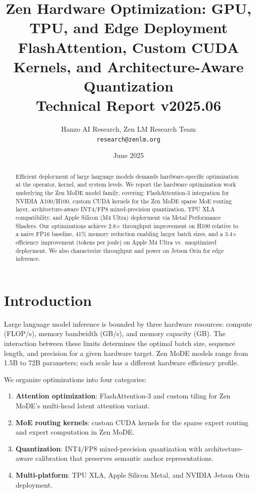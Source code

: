 \documentclass[11pt,a4paper]{article}
\title{\textbf{Zen Hardware Optimization: GPU, TPU, and Edge Deployment\\
FlashAttention, Custom CUDA Kernels, and Architecture-Aware Quantization}\\
\large Technical Report v2025.06}
\author{Hanzo AI Research, Zen LM Research Team\\
\texttt{research@zenlm.org}}
\date{June 2025}
\begin{document}
\maketitle

\begin{abstract}
Efficient deployment of large language models demands hardware-specific optimization at
the operator, kernel, and system levels. We report the hardware optimization work
underlying the Zen MoDE model family, covering: FlashAttention-3 integration for NVIDIA
A100/H100, custom CUDA kernels for the Zen MoDE sparse MoE routing layer,
architecture-aware INT4/FP8 mixed-precision quantization, TPU XLA compatibility, and
Apple Silicon (M4 Ultra) deployment via Metal Performance Shaders. Our optimizations
achieve 2.8$\times$ throughput improvement on H100 relative to a naive FP16 baseline,
41\% memory reduction enabling larger batch sizes, and a 3.4$\times$ efficiency
improvement (tokens per joule) on Apple M4 Ultra vs.\ unoptimized deployment. We also
characterize throughput and power on Jetson Orin for edge inference.
\end{abstract}

\tableofcontents
\newpage

\section{Introduction}
\label{sec:intro}

Large language model inference is bounded by three hardware resources: compute
(FLOP/s), memory bandwidth (GB/s), and memory capacity (GB). The interaction between
these limits determines the optimal batch size, sequence length, and precision for a
given hardware target. Zen MoDE models range from 1.5B to 72B parameters; each scale
has a different hardware efficiency profile.

We organize optimizations into four categories:

\begin{enumerate}
    \item \textbf{Attention optimization}: FlashAttention-3 \cite{shah2024flashattention3}
          and custom tiling for Zen MoDE's multi-head latent attention variant.
    \item \textbf{MoE routing kernels}: custom CUDA kernels for the sparse expert
          routing and expert computation in Zen MoDE.
    \item \textbf{Quantization}: INT4/FP8 mixed-precision quantization with
          architecture-aware calibration that preserves semantic anchor representations.
    \item \textbf{Multi-platform}: TPU XLA, Apple Silicon Metal, and NVIDIA Jetson Orin
          deployment.
\end{enumerate}
\end{document}
